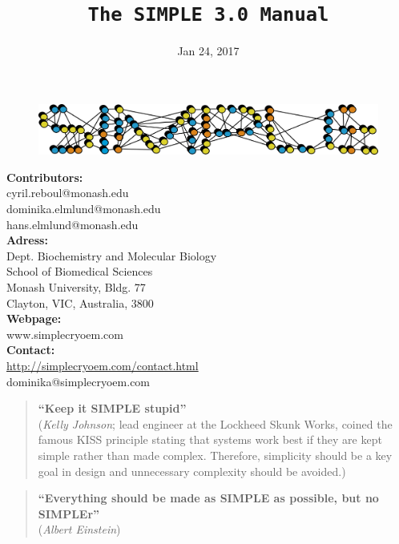 \documentclass[a4paper,11pt]{article}
\newcommand{\prgname}[1]{\textcolor{NavyBlue}{\texttt{#1}}}
\begin{document}
\begin{figure}
\centering
\includegraphics[keepaspectratio=true,scale=0.6]{./SIMPLE_logo/rawlogo}
\end{figure}

\title{\prgname{The SIMPLE 3.0 Manual}}
\date{Jan 24, 2017}
\maketitle

\vspace{1em}
\begin{minipage}[ht]{0.48\textwidth}
\textbf{Contributors:}\\
cyril.reboul@monash.edu\\
dominika.elmlund@monash.edu\\
hans.elmlund@monash.edu\\
\textbf{Adress:}\\
Dept. Biochemistry and Molecular Biology\\
School of Biomedical Sciences\\
Monash University, Bldg. 77\\
Clayton, VIC, Australia, 3800\\
\textbf{Webpage:}\\
www.simplecryoem.com\\
\textbf{Contact:}\\
\url{http://simplecryoem.com/contact.html}\\
dominika@simplecryoem.com\\
\end{minipage}
\vspace{20pt}

\begin{quote}
\textbf{``Keep it SIMPLE stupid''}\\(\textit{Kelly Johnson}; lead engineer at the Lockheed Skunk Works, coined the famous KISS principle stating that systems work best if they are kept simple rather than made complex. Therefore, simplicity should be a key goal in design and unnecessary complexity should be avoided.)
\end{quote}

\begin{quote}
\textbf{``Everything should be made as SIMPLE as possible, but no SIMPLEr''}\\(\textit{Albert Einstein})
\end{quote}
\end{document}
